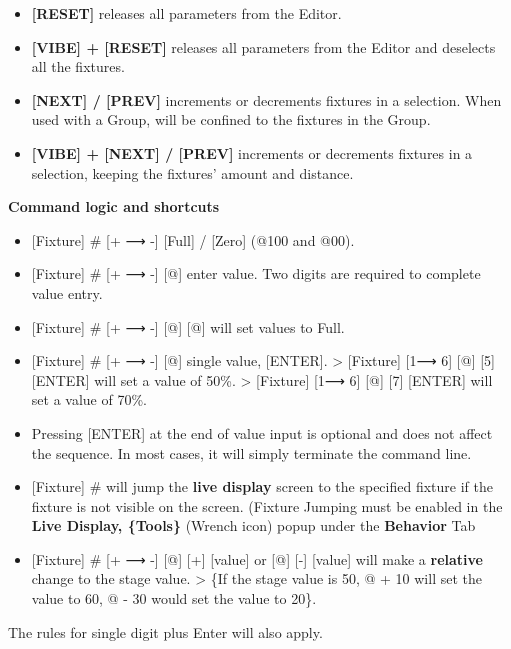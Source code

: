 \documentclass[
]{article}
\begin{document}
\begin{itemize}
\item
  \textbf{{[}RESET{]}} releases all parameters from the Editor.
\item
  \textbf{{[}VIBE{]} + {[}RESET{]}} releases all parameters from the Editor and deselects all the fixtures.
\item
  \textbf{{[}NEXT{]} / {[}PREV{]}} increments or decrements fixtures in a selection. When used with a Group, will be confined to the fixtures in the Group.
\item
  \textbf{{[}VIBE{]} + {[}NEXT{]} / {[}PREV{]}} increments or decrements fixtures in a selection, keeping the fixtures' amount and distance.
\end{itemize}

\textbf{Command logic and shortcuts}

\begin{itemize}
\item
  {[}Fixture{]} \# {[}+ ⟶ -{]} {[}Full{]} / {[}Zero{]} (@100 and @00).
\item
  {[}Fixture{]} \# {[}+ ⟶ -{]} {[}@{]} enter value. Two digits are required to complete value entry.
\item
  {[}Fixture{]} \# {[}+ ⟶ -{]} {[}@{]} {[}@{]} will set values to Full.
\item
  {[}Fixture{]} \# {[}+ ⟶ -{]} {[}@{]} single value, {[}ENTER{]}.
  \textgreater{} {[}Fixture{]} {[}1⟶ 6{]} {[}@{]} {[}5{]} {[}ENTER{]} will set a value of 50\%.
  \textgreater{} {[}Fixture{]} {[}1⟶ 6{]} {[}@{]} {[}7{]} {[}ENTER{]} will set a value of 70\%.
\item
  Pressing {[}ENTER{]} at the end of value input is optional and does not affect the sequence. In most cases, it will simply terminate the command line.
\item
  {[}Fixture{]} \# will jump the \textbf{live display} screen to the specified fixture if the fixture is not visible on the screen. (Fixture Jumping must be enabled in the \textbf{Live Display, \{Tools\}} (Wrench icon) popup under the \textbf{Behavior} Tab
\item
  {[}Fixture{]} \# {[}+ ⟶ -{]} {[}@{]} {[}+{]} {[}value{]} or {[}@{]} {[}-{]} {[}value{]} will make a \textbf{relative} change to the stage value.
  \textgreater{} \{If the stage value is 50, @ + 10 will set the value to 60, @ - 30 would set the value to 20\}.
\end{itemize}

The rules for single digit plus Enter will also apply.
\end{document}
